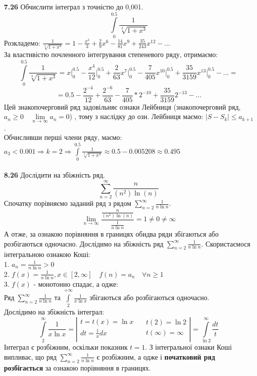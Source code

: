 \documentclass[14pt,a4paper]{scrartcl}
\theoremstyle{definition}
\theoremstyle{remark}
\theoremstyle{definition}
\theoremstyle{definition}
\begin{document}
\textbf{7.26} Обчислити інтеграл з точністю до 0,001.\\

$$
 \int\limits_{0}^{0.5}{\frac{1}{\sqrt[3]{1+x^3}} }
$$
Розкладемо: $ \frac{1}{\sqrt[3]{1+x^3}} =  1 - \frac{x^3}{3} + \frac{2}{9}x^6 - \frac{14}{81}x^9 + \frac{35}{243}x^{12} - ...  $\\
За властивістю почленного інтегрування степеневого ряду, отримаємо:\\
$$
 \int\limits_{0}^{0.5}
 {\frac{1}{\sqrt[3]{1+x^3}} } =
 x \bigg|_{0}^{0.5} -
 \frac{x^4}{12}\bigg|_{0}^{0.5}
 + \frac{2}{63} x^7 \bigg|_{0}^{0.5}
 - \frac{7}{405} x^{10} \bigg|_{0}^{0.5}
 + \frac{35}{3159}x^{13}\bigg|_{0}^{0.5} - ... =
$$
$$
= 0.5 - \frac{2^{-4}}{12} + \frac{2^{-6}}{63} - \frac{7}{405}*2^{-10} + \frac{35}{3159} 2^{-13}- ...
$$
Цей знакопочерговий ряд задовільняє ознаки Лейбниця
(знакопочерговий ряд, $a_n \geq 0 \quad  \lim\limits_{n\to  \infty}{a_n} = 0$)
, тому з наслідку до озн. Лейбниця маємо:
$ \left| S - S_k \right| \leq a_{k+1} $.\\
Обчисливши перші члени ряду, маємо: $ a_3< 0.001 \Rightarrow k=2 \Rightarrow  \int\limits_{0}^{0.5}{\frac{1}{\sqrt[3]{1+x^3}} } \approx 0.5 - 0.005208 \approx 0.495 $ \\
\pagebreak\\
\textbf{8.26} Дослідити на збіжність ряд.\\
$$
 \sum\limits_{n = 2}^{ \infty}{ \frac{n}{(n^2)\ln{(n)}} }
$$
Спочатку порівняємо заданий ряд з рядом $  \sum\limits_{n = 2}^{ \infty}{ \frac{1}{n \ln{n}} }$.
$$
 \lim\limits_{n\to  \infty}{ \frac{\frac{n}{(n^2)\ln{(n)}}}{\frac{1}{n \ln{n}}} } = 1 \neq 0 \neq \infty
$$
А отже, за ознакою порівняння в границях обидва ряди збігаються або розбігаються одночасно. Дослідимо на збіжність ряд $ \sum\limits_{n = 2}^{ \infty}{ \frac{1}{n \ln{n}} }$. Скористаємося інтегральною ознакою Коші:\\
1. $a_n = \frac{1}{n \ln{n}}>0$\\
2. $f(x) = \frac{1}{n \ln{n}}, x\in [2, \infty] \quad f(n) = a_n \quad \forall n\geq 1$\\
3. $f(x) $ - монотонно спадає, а одже:\\
Ряд $ \sum\limits_{n = 2}^{ \infty}{ \frac{1}{n \ln{n}} }$ та $ \int\limits_{2}^{ +\infty}{ \frac{1}{x \ln{x}} }$ збігаються або розбігаються одночасно.\\
Дослідимо на збіжність інтеграл:
$$
 \int\limits_{2}^{ \infty}{ \frac{1}{x \ln{x}} } = \left| \begin{gathered}
   t = t(x)= \ln{x} \\
   dt = \frac{1}{x}dx\\
 \end{gathered}\quad \begin{gathered}
   t(2) = \ln{2}\\
   t(\infty) = \infty\\
 \end{gathered} \right| =  \int\limits_{ \ln{2}}^{ \infty}{ \frac{dt}{t} }
$$
Інтеграл є розбіжним, оскільки показник $t = 1$. З інтегральної ознаки Коші випливає, що ряд $  \sum\limits_{n = 2}^{ \infty}{ \frac{1}{n \ln{n}} } $ є розбіжним, а одже і \textbf{початковий ряд розбігається} за ознакою порівняння в границях.
\end{document}

